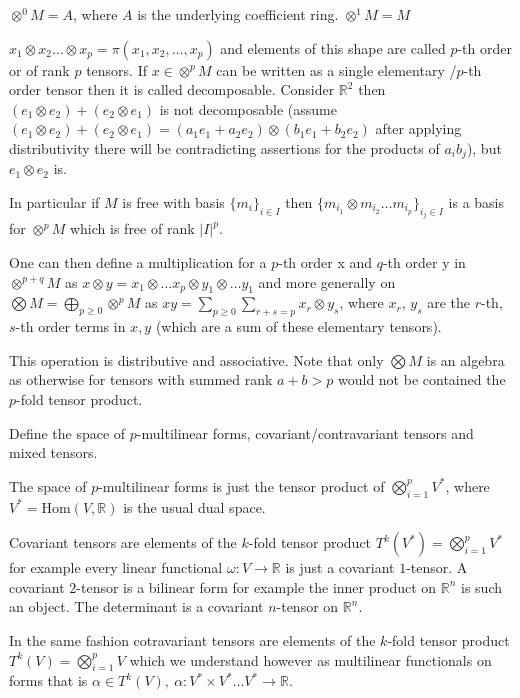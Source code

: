 \(\otimes^{0} M = A\), where \(A\) is the underlying coefficient ring.
\(\otimes^{1} M = M\)

\(x_1 \otimes x_2 \dots \otimes x_p = \pi(x_1, x_2, \dots, x_p) \) and elements of this shape
are called \(p\)-th order or of rank \( p \) tensors. If \(x \in \otimes^{p} M\) can be written as a single elementary
/\(p\)-th order tensor then it is called decomposable. Consider \(\mathbb{R}^{2}\) then \((e_1 \otimes e_2) + (e_2 \otimes e_1)\)
is not decomposable (assume \((e_1 \otimes e_2) + (e_2 \otimes e_1) = (a_1 e_1 + a_2 e_2) \otimes (b_1 e_1 + b_2 e_2)\) after applying
distributivity there will be contradicting assertions for the products of \(a_ib_j\)), but \(e_1 \otimes e_2\) is.

In particular if \(M\) is free with basis \(\{m_i\}_{i \in I}\) then \(\{m_{i_1} \otimes m_{i_2} \dots m_{i_p}\}_{i_j \in I}\)
is a basis for \(\otimes^{p} M\) which is free of rank \(|I|^p\).

One can then define a multiplication for a \(p\)-th order x and \(q\)-th order y in \(\otimes^{p + q} M\) as 
\(x \otimes y = x_1 \otimes \dots x_p \otimes y_1 \otimes \dots y_1\) and more generally on 
\(\bigotimes M = \bigoplus_{p \geq 0} \otimes^{p} M\) as \(x y = \sum_{p \geq 0} \sum_{r + s = p} x_r \otimes y_s\), 
where \(x_r\), \(y_s\) are the \(r\)-th, \(s\)-th order terms in \(x, y\) (which are a sum of these elementary tensors).

This operation is distributive and associative.
Note that only \( \bigotimes M \) is an algebra as otherwise for tensors with summed rank \( a + b > p \)
would not be contained the \( p \)-fold tensor product.


Define the space of \( p \)-multilinear forms, covariant/contravariant
tensors and mixed tensors.

The space of \( p \)-multilinear forms is just the tensor product of \(\bigotimes_{i = 1}^{p} V^\ast\),
where \( V^\ast = \text{Hom}(V, \mathbb{R}) \) is the usual dual space.

Covariant tensors are elements of the \( k \)-fold tensor product \( T^k(V^\ast) = \bigotimes_{i = 1}^{p} V^\ast\)
for example every linear functional \( \omega : V \to \mathbb{R} \) is just a covariant \( 1 \)-tensor.
A covariant \( 2 \)-tensor is a bilinear form for example the inner product on \( \mathbb{R}^n \) is such an object.
The determinant is a covariant \( n \)-tensor on \( \mathbb{R}^n \).

In the same fashion cotravariant tensors are elements of the \( k \)-fold tensor product \( T^k(V) = \bigotimes_{i = 1}^{p} V\)
which we understand however as multilinear functionals on forms that is 
\( \alpha \in T^k(V),\ \alpha : V^\ast \times V^\ast \dots V^\ast \to \mathbb{R}\).

